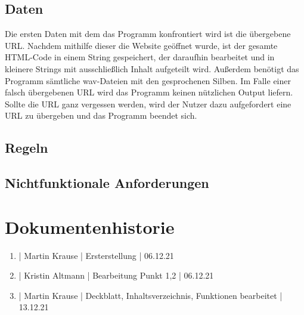 \documentclass[12pt]{scrartcl}
\begin{document}
\subsection{Daten}
Die ersten Daten mit dem das Programm konfrontiert wird ist die übergebene URL. Nachdem mithilfe dieser
die Website geöffnet wurde, ist der gesamte HTML-Code in einem String gespeichert, der daraufhin bearbeitet
und in kleinere Strings mit ausschließlich Inhalt aufgeteilt wird. Außerdem benötigt das Programm sämtliche
wav-Dateien mit den gesprochenen Silben. Im Falle einer falsch übergebenen URL wird das Programm keinen nützlichen Output liefern. Sollte die URL ganz vergessen werden, wird der Nutzer dazu aufgefordert eine URL zu übergeben und das Programm beendet sich.


\subsection{Regeln}


\subsection{Nichtfunktionale Anforderungen}


\section{Dokumentenhistorie}

\begin{enumerate}
	\item | Martin Krause | Ersterstellung | 06.12.21
	\item | Kristin Altmann | Bearbeitung Punkt 1,2  | 06.12.21
	\item | Martin Krause | Deckblatt, Inhaltsverzeichnis, Funktionen bearbeitet | 13.12.21
\end{enumerate}
 
\end{document}
